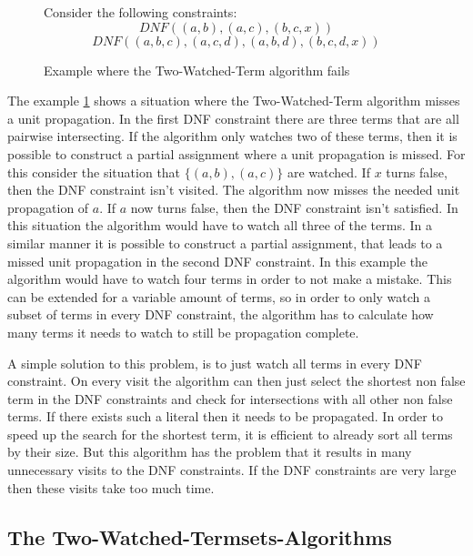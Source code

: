 \begin{figure}[!htb]
\begin{leftbar}
Consider the following constraints:
\begin{displaymath}
DNF ((a,b),(a,c),(b,c,x))
\end{displaymath}
\begin{displaymath}
DNF ((a,b,c),(a,c,d),(a,b,d),(b,c,d,x))
\end{displaymath}
\end{leftbar}
\caption{Example where the Two-Watched-Term algorithm fails}
\label{ex:NotPropagationComplete}
\end{figure}

The example \ref{ex:NotPropagationComplete} shows a situation where the Two-Watched-Term algorithm misses a unit propagation. In the first DNF constraint there are three terms that are all pairwise intersecting. If the algorithm only watches two of these terms, then it is possible to construct a partial assignment where a unit propagation is missed. For this consider the situation that $\{(a,b),(a,c)\}$ are watched. If $x$ turns false, then the DNF constraint isn't visited. The algorithm now misses the needed unit propagation of $a$. If $a$ now turns false, then the DNF constraint isn't satisfied. In this situation the algorithm would have to watch all three of the terms.
In a similar manner it is possible to construct a partial assignment, that leads to a missed unit propagation in the second DNF constraint. In this example the algorithm would have to watch four terms in order to not make a mistake. This can be extended for a variable amount of terms, so in order to only watch a subset of terms in every DNF constraint, the algorithm has to calculate how many terms it needs to watch to still be propagation complete. 

A simple solution to this problem, is to just watch all terms in every DNF constraint.
On every visit the algorithm can then just select the shortest non false term in the DNF constraints and check for intersections with all other non false terms. If there exists such a literal then it needs to be propagated. In order to speed up the search for the shortest term, it is efficient to already sort all terms by their size. But this algorithm has the problem that it results in many unnecessary visits to the DNF constraints. If the DNF constraints are very large then these visits take too much time.

\subsection{The Two-Watched-Termsets-Algorithms}

